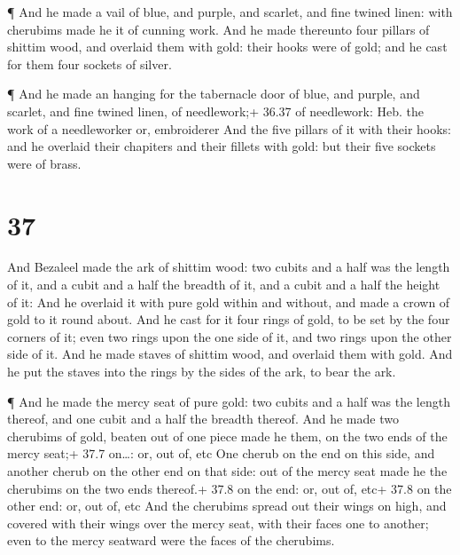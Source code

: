  ¶ And he made a vail of blue, and purple, and scarlet, and
fine twined linen: with cherubims made he it of cunning work.
 And he made thereunto four pillars of shittim wood, and
overlaid them with gold: their hooks were of gold; and he cast for them
four sockets of silver.

 ¶ And he made an hanging for the tabernacle door of blue,
and purple, and scarlet, and fine twined linen, of needlework;+ 36.37 of
needlework: Heb. the work of a needleworker or, embroiderer
 And the five pillars of it with their hooks: and he
overlaid their chapiters and their fillets with gold: but their five
sockets were of brass.

\hypertarget{section-36}{%
\section{37}\label{section-36}}

 And Bezaleel made the ark of shittim wood: two cubits and a
half was the length of it, and a cubit and a half the breadth of it, and
a cubit and a half the height of it:  And he overlaid it
with pure gold within and without, and made a crown of gold to it round
about.  And he cast for it four rings of gold, to be set by
the four corners of it; even two rings upon the one side of it, and two
rings upon the other side of it.  And he made staves of
shittim wood, and overlaid them with gold.  And he put the
staves into the rings by the sides of the ark, to bear the ark.

 ¶ And he made the mercy seat of pure gold: two cubits and a
half was the length thereof, and one cubit and a half the breadth
thereof.  And he made two cherubims of gold, beaten out of
one piece made he them, on the two ends of the mercy seat;+ 37.7
on\ldots: or, out of, etc  One cherub on the end on this
side, and another cherub on the other end on that side: out of the mercy
seat made he the cherubims on the two ends thereof.+ 37.8 on the end:
or, out of, etc+ 37.8 on the other end: or, out of, etc  And
the cherubims spread out their wings on high, and covered with their
wings over the mercy seat, with their faces one to another; even to the
mercy seatward were the faces of the cherubims.

